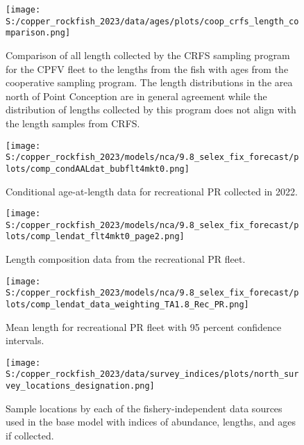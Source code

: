 \documentclass[11pt,
  english,
  letterpaper,
]{article}
\begin{document}
\pagebreak

\begin{figure}
\centering
\texttt{[image: S:/copper\_rockfish\_2023/data/ages/plots/coop\_crfs\_length\_comparison.png]}
\caption{Comparison of all length collected by the CRFS sampling program for the CPFV fleet to the lengths from the fish with ages from the cooperative sampling program. The length distributions in the area north of Point Conception are in general agreement while the distribution of lengths collected by this program does not align with the length samples from CRFS.\label{fig:coop-len-comparison}}
\end{figure}

\pagebreak

\begin{figure}
\centering
\texttt{[image: S:/copper\_rockfish\_2023/models/nca/9.8\_selex\_fix\_forecast/plots/comp\_condAALdat\_bubflt4mkt0.png]}
\caption{Conditional age-at-length data for recreational PR collected in 2022.\label{fig:rec-pr-caal-data}}
\end{figure}

\pagebreak

\begin{figure}
\centering
\texttt{[image: S:/copper\_rockfish\_2023/models/nca/9.8\_selex\_fix\_forecast/plots/comp\_lendat\_flt4mkt0\_page2.png]}
\caption{Length composition data from the recreational PR fleet.\label{fig:rec-pr-len-data}}
\end{figure}

\pagebreak

\begin{figure}
\centering
\texttt{[image: S:/copper\_rockfish\_2023/models/nca/9.8\_selex\_fix\_forecast/plots/comp\_lendat\_data\_weighting\_TA1.8\_Rec\_PR.png]}
\caption{Mean length for recreational PR fleet with 95 percent confidence intervals.\label{fig:mean-rec-pr-len-data}}
\end{figure}

\pagebreak

\begin{figure}
\centering
\texttt{[image: S:/copper\_rockfish\_2023/data/survey\_indices/plots/north\_survey\_locations\_designation.png]}
\caption{Sample locations by each of the fishery-independent data sources used in the base model with indices of abundance, lengths, and ages if collected.\label{fig:survey-locations}}
\end{figure}
\end{document}
